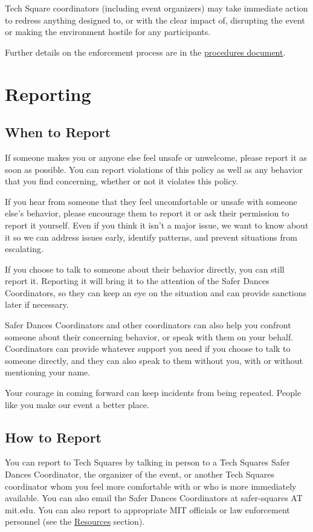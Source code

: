 \documentclass{article}
\newcommand{\baseurl}{\latexhtml{https://www.mit.edu/~tech-squares/govdocs/}{}}
\newcommand{\matchextension}{.\latexhtml{pdf}{html}}
\newcommand{\matchlink}[2]{\href{\baseurl#1\matchextension}{#2}}
\begin{document}
Tech Square coordinators (including event organizers) may take immediate action to redress anything designed to, or with the clear impact of, disrupting the event or making the environment hostile for any participants.

Further details on the enforcement process are in the \matchlink{safer-dances-procedures}{procedures document}.

\section{Reporting}

\subsection*{When to Report}

If someone makes you or anyone else feel unsafe or unwelcome, please report it as soon as possible. You can report violations of this policy as well as any behavior that you find concerning, whether or not it violates this policy.

If you hear from someone that they feel uncomfortable or unsafe with someone else's behavior, please encourage them to report it or ask their permission to report it yourself. Even if you think it isn't a major issue, we want to know about it so we can address issues early, identify patterns, and prevent situations from escalating.

If you choose to talk to someone about their behavior directly, you can still report it. Reporting it will bring it to the attention of the Safer Dances Coordinators, so they can keep an eye on the situation and can provide sanctions later if necessary.

Safer Dances Coordinators and other coordinators can also help you confront someone about their concerning behavior, or speak with them on your behalf. Coordinators can provide whatever support you need if you choose to talk to someone directly, and they can also speak to them without you, with or without mentioning your name.

Your courage in coming forward can keep incidents from being repeated. People like you make our event a better place.

\subsection*{How to Report}

You can report to Tech Squares by talking in person to a Tech Squares Safer Dances Coordinator, the organizer of the event, or another Tech Squares coordinator whom you feel more comfortable with or who is more immediately available. You can also email the Safer Dances Coordinators at safer-squares AT mit.edu. You can also report to appropriate MIT officials or law enforcement personnel (see the \hyperref[sec:resources]{Resources} section).
\end{document}
